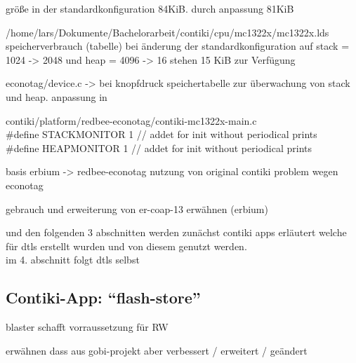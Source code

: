 größe in der standardkonfiguration 84KiB. durch anpassung 81KiB

/home/lars/Dokumente/Bachelorarbeit/contiki/cpu/mc1322x/mc1322x.lds\\
speicherverbrauch (tabelle) bei änderung der standardkonfiguration auf stack = 1024 -> 2048 und heap = 4096 -> 16 stehen 15 KiB zur Verfügung

econotag/device.c  -> bei knopfdruck speichertabelle zur überwachung von stack und heap. anpassung in 


contiki/platform/redbee-econotag/contiki-mc1322x-main.c\\
\#define STACKMONITOR 1 // addet for init without periodical prints\\
\#define HEAPMONITOR 1  // addet for init without periodical prints


basis erbium -> redbee-econotag nutzung von original contiki problem wegen econotag

gebrauch und erweiterung von er-coap-13 erwähnen (erbium)

und den folgenden 3 abschnitten werden zunächst contiki apps erläutert welche für dtls erstellt wurden und von diesem genutzt werden.\\
im 4. abschnitt folgt dtls selbst 

\subsection{Contiki-App: "`flash-store"'}

blaster schafft vorraussetzung für RW

erwähnen dass aus gobi-projekt aber verbessert / erweitert / geändert

